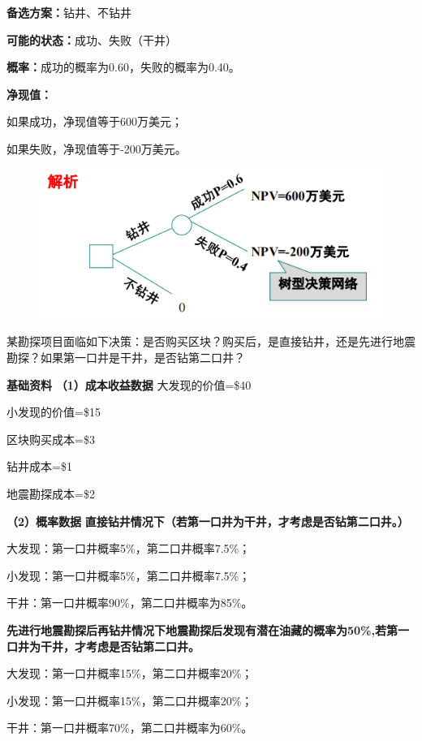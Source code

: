 \textbf{备选方案：}钻井、不钻井

\textbf{可能的状态：}成功、失败（干井）

\textbf{概率：}成功的概率为0.60，失败的概率为0.40。

\textbf{净现值：}

如果成功，净现值等于600万美元；

如果失败，净现值等于-200万美元。

\begin{figure}[H]
    \centering
    \includegraphics[width=\linewidth]{image/决策树.png}
\end{figure}

某勘探项目面临如下决策：是否购买区块？购买后，是直接钻井，还是先进行地震勘探？如果第一口井是干井，是否钻第二口井？

\noindent \textbf{基础资料}
\noindent \textbf{（1）成本收益数据}
大发现的价值=\$40

小发现的价值=\$15

区块购买成本=\$3

钻井成本=\$1

地震勘探成本=\$2

\noindent \textbf{（2）概率数据}
\textbf{直接钻井情况下（若第一口井为干井，才考虑是否钻第二口井。）}

大发现：第一口井概率5\%，第二口井概率7.5\%；

小发现：第一口井概率5\%，第二口井概率7.5\%；

干井：第一口井概率90\%，第二口井概率为85\%。

\textbf{先进行地震勘探后再钻井情况下地震勘探后发现有潜在油藏的概率为50\%,若第一口井为干井，才考虑是否钻第二口井。}

大发现：第一口井概率15\%，第二口井概率20\%；

小发现：第一口井概率15\%，第二口井概率20\%；

干井：第一口井概率70\%，第二口井概率为60\%。

